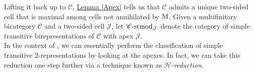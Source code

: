 \noindent Lifting it back up to $\mathscr{C}$, \hyperref[Apex]{Lemma \ref*{Apex}} tells us that $\mathscr{C}$ admits a unique two-sided cell that is maximal among cells not annihilated by $\textup{M}$. Given a multifinitary bicategory $\mathscr{C}$ and a two-sided cell $\mathcal{J}$, let $\mathscr{C}\textup{-stmod}_\mathcal{J}$ denote the category of simple transitive birepresentations of $\mathscr{C}$ with apex $\mathcal{J}$.\\ %

\noindent In the context of \cite{MMMTZ23}, we can essentially perform the classification of simple transitive $2$-representations by looking at the apexes. In fact, we can take this reduction one step further via a technique known as {\em $\mathcal{H}$-reduction}.\\

